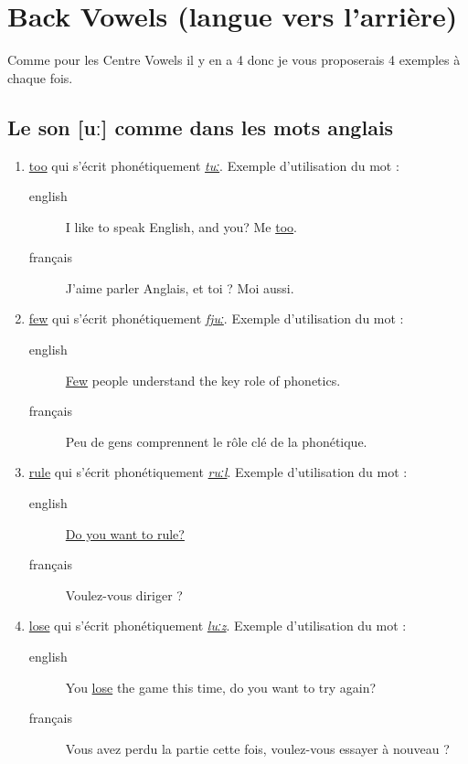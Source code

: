 \section{Back Vowels (langue vers l'arrière)}
\label{sec:org02857bf}
Comme pour les Centre Vowels il y en a 4 donc je vous proposerais 4
exemples à chaque fois.
\subsection{Le son [uː] comme dans les mots anglais}
\label{sec:org635c7e0}
\begin{enumerate}
\item \href{http://www.wordreference.com/enfr/too}{too} qui s'écrit phonétiquement \href{https://en.oxforddictionaries.com/definition/too}{\emph{tuː}}. Exemple d'utilisation du mot :
\begin{description}
\item[{english}] \textenglish{I like to speak English, and you? Me \href{https://youtu.be/RaveinO4\_vs}{too}.}
\item[{français}] J'aime parler Anglais, et toi ? Moi aussi.
\end{description}
\item \href{http://www.wordreference.com/enfr/few}{few} qui s'écrit phonétiquement \href{https://en.oxforddictionaries.com/definition/few}{\emph{fjuː}}. Exemple d'utilisation du mot :
\begin{description}
\item[{english}] \textenglish{\href{https://youtu.be/r3TaGhdqEiA}{Few} people understand the key role of phonetics.}
\item[{français}] Peu de gens comprennent le rôle clé de la phonétique.
\end{description}
\item \href{http://www.wordreference.com/enfr/rule}{rule} qui s'écrit phonétiquement \href{https://en.oxforddictionaries.com/definition/rule}{\emph{ruːl}}. Exemple d'utilisation du mot : 
\begin{description}
\item[{english}] \textenglish{\href{https://youtu.be/rStL7niR7gs}{Do you want to rule?}}
\item[{français}] Voulez-vous diriger ?
\end{description}
\item \href{http://www.wordreference.com/enfr/lose}{lose} qui s'écrit phonétiquement \href{https://en.oxforddictionaries.com/definition/lose}{\emph{luːz}}. Exemple d'utilisation du mot :
\begin{description}
\item[{english}] \textenglish{You \href{https://youtu.be/UNcCTgA5lzo}{lose} the game this time, do you want to try again?}
\item[{français}] Vous avez perdu la partie cette fois, voulez-vous
essayer à nouveau ?
\end{description}
\end{enumerate}
